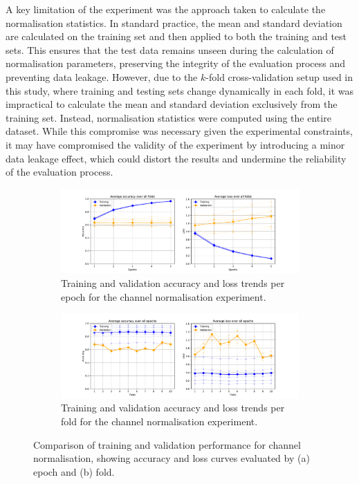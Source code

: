 A key limitation of the experiment was the approach taken to calculate the normalisation statistics. In standard practice, the mean and standard deviation are calculated on the training set and then applied to both the training and test sets. This ensures that the test data remains unseen during the calculation of normalisation parameters, preserving the integrity of the evaluation process and preventing data leakage. However, due to the $k$-fold cross-validation setup used in this study, where training and testing sets change dynamically in each fold, it was impractical to calculate the mean and standard deviation exclusively from the training set. Instead, normalisation statistics were computed using the entire dataset. While this compromise was necessary given the experimental constraints, it may have compromised the validity of the experiment by introducing a minor data leakage effect, which could distort the results and undermine the reliability of the evaluation process.

\begin{figure}[htbp]
    \centering
    \begin{subfigure}{\textwidth}
        \centering
        \includegraphics[trim={3cm 0 3cm 0.8cm},clip,width=\textwidth]{img/ch4/channel/channel_by_epoch.pdf}
        \caption{Training and validation accuracy and loss trends per epoch for the channel normalisation experiment.}
        \label{fig:channel-norm-by-epoch}
    \end{subfigure}
    
    \vspace{1cm}
    
    \begin{subfigure}{\textwidth}
        \centering
        \includegraphics[trim={3cm 0 3cm 0.8cm},clip,width=\textwidth]{img/ch4/channel/channel_by_fold.pdf}
        \caption{Training and validation accuracy and loss trends per fold for the channel normalisation experiment.}
        \label{fig:channel-norm-by-fold}
    \end{subfigure}
    \caption{Comparison of training and validation performance for channel normalisation, showing accuracy and loss curves evaluated by (a) epoch and (b) fold.} 
    \label{fig:channel-norm-acc-loss}
\end{figure}

